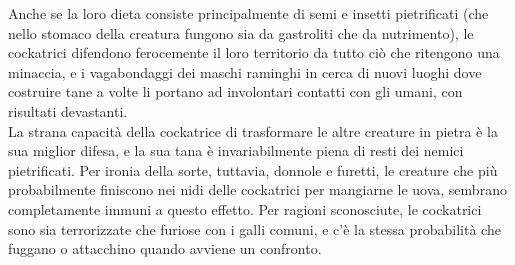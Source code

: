 \begin{multicols}{2}
Anche se la loro dieta consiste principalmente di semi e insetti pietrificati (che nello stomaco della creatura fungono sia da gastroliti che da nutrimento), le cockatrici difendono ferocemente il loro territorio da tutto ciò che ritengono una minaccia, e i vagabondaggi dei maschi raminghi in cerca di nuovi luoghi dove costruire tane a volte li portano ad involontari contatti con gli umani, con risultati devastanti.\\
La strana capacità della cockatrice di trasformare le altre creature in pietra è la sua miglior difesa, e la sua tana è invariabilmente piena di resti dei nemici pietrificati. Per ironia della sorte, tuttavia, donnole e furetti, le creature che più probabilmente finiscono nei nidi delle cockatrici per mangiarne le uova, sembrano completamente immuni a questo effetto. Per ragioni sconosciute, le cockatrici sono sia terrorizzate che furiose con i galli comuni, e c’è la stessa probabilità che fuggano o attacchino quando avviene un confronto.\\


\end{multicols}

